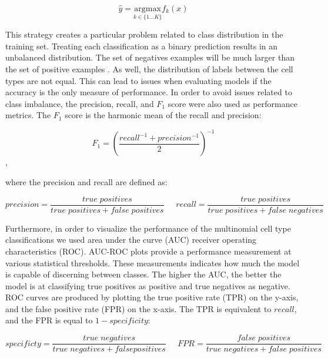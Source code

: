 \begin{equation*}
    \hat{y} =  \underset{k \in \{ 1 \dotsc K \}}{\mathrm{argmax}}f_k(x) 
\end{equation*}

\noindent
This strategy creates a particular problem related to class distribution in the training set. Treating each classification as a binary prediction results in an unbalanced distribution. The set of negatives examples will be much larger than the set of positive examples \cite{bishop2006pattern}. As well, the distribution of labels between the cell types are not equal. This can lead to issues when evaluating models if the accuracy is the only measure of performance. In order to avoid issues related to class imbalance, the precision, recall, and $F_1$ score were also used as performance metrics. The $F_1$ score is the harmonic mean of the recall and precision:

\begin{equation*}
F_1 = \left ( \frac{recall^{-1} + precision^{-1}}{2} \right )^{-1}
\end{equation*},

\noindent
where the precision and recall are defined as:

\begin{equation*}
    precision = \frac{true \; positives}{true \; positives + false \; positives} \;\;\;\;\; recall = \frac{true \; positives}{true \; positives + false \; negatives}
\end{equation*}

\noindent
Furthermore, in order to visualize the performance of the multinomial cell type classifications we used area under the curve (AUC) receiver operating characteristics (ROC). AUC-ROC plots provide a performance measurement at various statistical thresholds. These measurements indicates how much the model is capable of discerning between classes. The higher the AUC, the better the model is at classifying true positives as positive and true negatives as negative. ROC curves are produced by plotting the true positive rate (TPR) on the y-axis, and the false positive rate (FPR) on the x-axis. The TPR is equivalent to $recall$, and the FPR is equal to $1 - specificity$:

\begin{equation*}
    specificty = \frac{true \; negatives}{true \; negatives + false positives} \;\;\;\;\; FPR = \frac{false \; positives}{true \; negatives + false \; positives}
\end{equation*}

